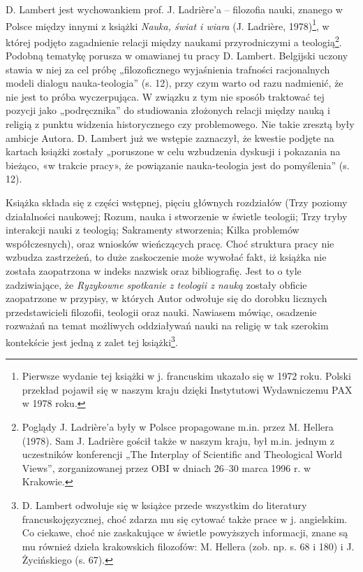 \documentclass[a4paper]{article}
\begin{document}
D. Lambert jest wychowankiem prof. J. Ladrière’a – filozofia nauki, znanego w Polsce między innymi z książki
\textit{Nauka, świat i wiara} \label{ref:RNDXHkGC7dOLL}(J. Ladrière, 1978)\footnote{ Pierwsze wydanie tej książki w j.
francuskim ukazało się w 1972 roku. Polski przekład pojawił się w naszym kraju dzięki Instytutowi Wydawniczemu PAX w
1978 roku. }, w której podjęto zagadnienie relacji między naukami przyrodniczymi a teologią\footnote{ Poglądy J.
Ladrière’a były w Polsce propagowane m.in. przez M. Hellera \label{ref:RND7C8ACognRO}(1978). Sam J. Ladrière gościł
także w naszym kraju, był m.in. jednym z uczestników konferencji „The Interplay of Scientific and Theological World
Views”, zorganizowanej przez OBI w dniach 26–30 marca 1996 r. w Krakowie.}. Podobną tematykę porusza w omawianej tu
pracy D. Lambert. Belgijski uczony stawia w niej za cel próbę „filozoficznego wyjaśnienia trafności racjonalnych modeli
dialogu nauka-teologia” (s. 12), przy czym warto od razu nadmienić, że nie jest to próba wyczerpująca. W związku z tym
nie sposób traktować tej pozycji jako „podręcznika” do studiowania złożonych relacji między nauką i religią z punktu
widzenia historycznego czy problemowego. Nie takie zresztą były ambicje Autora. D. Lambert już we wstępie zaznaczył, że
kwestie podjęte na kartach książki zostały „poruszone w celu wzbudzenia dyskusji i pokazania na bieżąco, «w trakcie
pracy», że powiązanie nauka-teologia jest do pomyślenia” (s. 12).

Książka składa się z części wstępnej, pięciu głównych rozdziałów (Trzy poziomy działalności naukowej; Rozum, nauka i
stworzenie w świetle teologii; Trzy tryby interakcji nauki z teologią; Sakramenty stworzenia; Kilka problemów
współczesnych), oraz wniosków wieńczących pracę. Choć struktura pracy nie wzbudza zastrzeżeń, to duże zaskoczenie może
wywołać fakt, iż książka nie została zaopatrzona w indeks nazwisk oraz bibliografię. Jest to o tyle zadziwiające, że
\textit{Ryzykowne spotkanie z teologii z nauką} zostały obficie zaopatrzone w przypisy, w których Autor odwołuje się do
dorobku licznych przedstawicieli filozofii, teologii oraz nauki. Nawiasem mówiąc, osadzenie rozważań na temat możliwych
oddziaływań nauki na religię w tak szerokim kontekście jest jedną z zalet tej książki\footnote{ D. Lambert odwołuje się
w książce przede wszystkim do literatury francuskojęzycznej, choć zdarza mu się cytować także prace w j. angielskim. Co
ciekawe, choć nie zaskakujące w świetle powyższych informacji, znane są mu również dzieła krakowskich filozofów: M.
Hellera (zob. np. s. 68 i 180) i J. Życińskiego (s. 67).}. 
\end{document}
